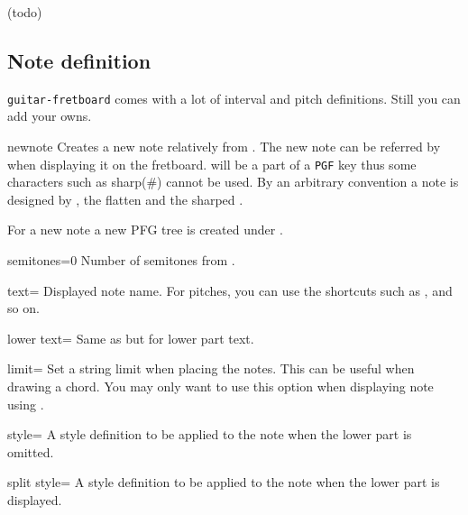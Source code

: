 \documentclass[a4paper]{article}
\newcommand{\pkg}[1]{\texttt{#1}}
\begin{document}
(todo)

\subsection{Note definition}

\pkg{guitar-fretboard} comes with a lot of interval and pitch
definitions. Still you can add your owns.

\begin{docCommand}{newnote}{}
  Creates a new note  relatively from \pC. The new note can be
  referred by  when displaying it on the fretboard. 
  will be a part of a \pkg{PGF} key thus some characters such as sharp(\#)
  cannot be used. By an arbitrary convention a note is designed by
  , the flatten  and the sharped
  .

  For a new note a new PFG tree is created under .

  \begin{docKey}{semitones}{=}{0}
    Number of semitones from \pC.
  \end{docKey}

  \begin{docKey}{text}{=}{}
    Displayed note name. For pitches, you can use the  shortcuts such
    as ,   and so on.
  \end{docKey}

  \begin{docKey}{lower text}{=}{}
    Same as  but for lower part text.
  \end{docKey}

  \begin{docKey}{limit}{=}{}
    Set a string limit when placing the notes. This can be useful when
    drawing a chord. You may only want to use this option when displaying
    note using .
  \end{docKey}

  \begin{docKey}{style}{=}{}
    A style definition to be applied to the note when the lower part is
    omitted.
  \end{docKey}

  \begin{docKey}{split style}{=}{}
    A style definition to be applied to the note when the lower part is
    displayed.
  \end{docKey}


\end{docCommand}
\end{document}

